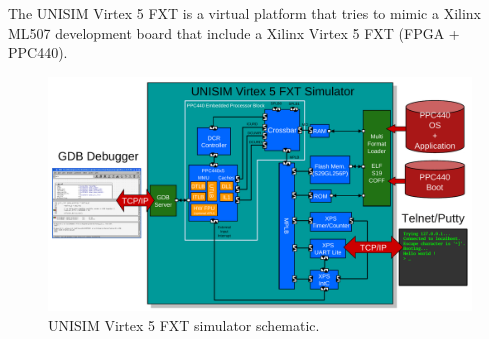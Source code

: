 The UNISIM Virtex 5 FXT is a virtual platform that tries to mimic a Xilinx ML507 development board that include a Xilinx Virtex 5 FXT (FPGA + PPC440).

\begin{figure}[!ht]
	\begin{center}
		\includegraphics[width=\textwidth]{virtex5fxt/fig_schematic.pdf}
	\end{center}
	\caption{UNISIM Virtex 5 FXT simulator schematic.}
	\label{fig:simulator_schematic}
\end{figure}

